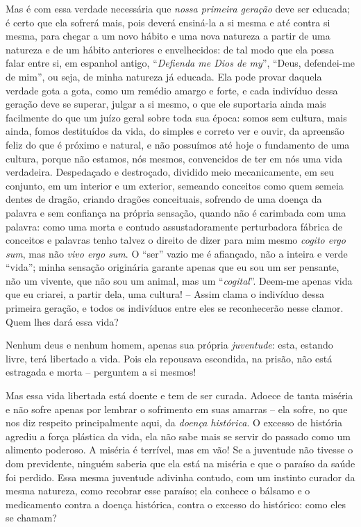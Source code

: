 \begin{enumerate}
\begin{enumerate}
    Mas é com essa verdade necessária que \emph{nossa primeira geração}
    deve ser educada; é certo que ela sofrerá mais, pois deverá
    ensiná-la a si mesma e até contra si mesma, para chegar a um novo
    hábito e uma nova natureza a partir de uma natureza e de um hábito
    anteriores e envelhecidos: de tal modo que ela possa falar entre si,
    em espanhol antigo, ``\emph{Defienda me Dios de my}'', ``Deus,
    defendei-me de mim'', ou seja, de minha natureza já educada. Ela
    pode provar daquela verdade gota a gota, como um remédio amargo e
    forte, e cada indivíduo dessa geração deve se superar, julgar a si
    mesmo, o que ele suportaria ainda mais facilmente do que um juízo
    geral sobre toda sua época: somos sem cultura, mais ainda, fomos
    destituídos da vida, do simples e correto ver e ouvir, da apreensão
    feliz do que é próximo e natural, e não possuímos até hoje o
    fundamento de uma cultura, porque não estamos, nós mesmos,
    convencidos de ter em nós uma vida verdadeira. Despedaçado e
    destroçado, dividido meio mecanicamente, em seu conjunto, em um
    interior e um exterior, semeando conceitos como quem semeia dentes
    de dragão, criando dragões conceituais, sofrendo de uma doença da
    palavra e sem confiança na própria sensação, quando não é carimbada
    com uma palavra: como uma morta e contudo assustadoramente
    perturbadora fábrica de conceitos e palavras tenho talvez o direito
    de dizer para mim mesmo \emph{cogito ergo sum}, mas não \emph{vivo
    ergo sum}. O ``ser'' vazio me é afiançado, não a inteira e verde
    ``vida''; minha sensação originária garante apenas que eu sou um ser
    pensante, não um vivente, que não sou um animal, mas um
    ``\emph{cogital}''. Deem-me apenas vida que eu criarei, a partir
    dela, uma cultura! -- Assim clama o indivíduo dessa primeira
    geração, e todos os indivíduos entre eles se reconhecerão nesse
    clamor. Quem lhes dará essa vida?

    Nenhum deus e nenhum homem, apenas sua própria \emph{juventude}:
    esta, estando livre, terá libertado a vida. Pois ela repousava
    escondida, na prisão, não está estragada e morta -- perguntem a si
    mesmos!

    Mas essa vida libertada está doente e tem de ser curada. Adoece de
    tanta miséria e não sofre apenas por lembrar o sofrimento em suas
    amarras -- ela sofre, no que nos diz respeito principalmente aqui,
    da \emph{doença histórica}. O excesso de história agrediu a força
    plástica da vida, ela não sabe mais se servir do passado como um
    alimento poderoso. A miséria é terrível, mas em vão! Se a juventude
    não tivesse o dom previdente, ninguém saberia que ela está na
    miséria e que o paraíso da saúde foi perdido. Essa mesma juventude
    adivinha contudo, com um instinto curador da mesma natureza, como
    recobrar esse paraíso; ela conhece o bálsamo e o medicamento contra
    a doença histórica, contra o excesso do histórico: como eles se
    chamam?


\end{enumerate}
\end{enumerate}
